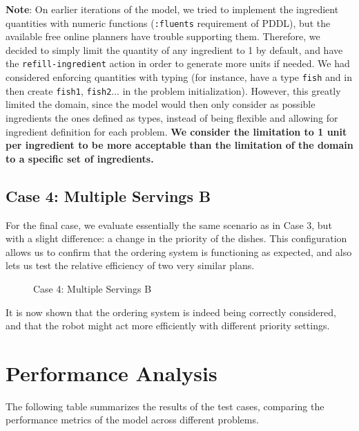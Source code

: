 \documentclass{article}
\begin{document}
\textbf{Note}: On earlier iterations of the model, we tried to implement the ingredient quantities with numeric functions (\texttt{:fluents} requirement of PDDL), but the available free online planners have trouble supporting them. Therefore, we decided to simply limit the quantity of any ingredient to 1 by default, and have the \texttt{refill-ingredient} action in order to generate more units if needed. We had considered enforcing quantities with typing (for instance, have a type \texttt{fish} and in then create \texttt{fish1}, \texttt{fish2}... in the problem initialization). However, this greatly limited the domain, since the model would then only consider as possible ingredients the ones defined as types, instead of being flexible and allowing for ingredient definition for each problem. \textbf{We consider the limitation to 1 unit per ingredient to be more acceptable than the limitation of the domain to a specific set of ingredients.}

\subsection{Case 4: Multiple Servings B}

For the final case, we evaluate essentially the same scenario as in Case 3, but with a slight difference: a change in the priority of the dishes. This configuration allows us to confirm that the ordering system is functioning as expected, and also lets us test the relative efficiency of two very similar plans.

\begin{figure}[ht]
    \centering
    \caption{Case 4: Multiple Servings B}
    \label{fig:initial-state-servingsB}
\end{figure}
\FloatBarrier

It is now shown that the ordering system is indeed being correctly considered, and that the robot might act more efficiently with different priority settings.

\section{Performance Analysis}

The following table summarizes the results of the test cases, comparing the performance metrics of the model across different problems.
\end{document}

